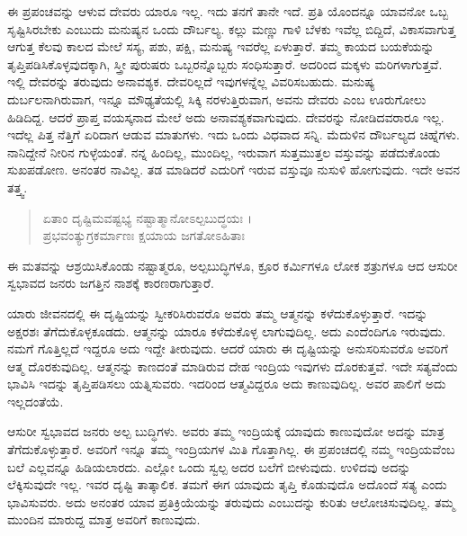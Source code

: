 ಈ ಪ್ರಪಂಚವನ್ನು ಆಳುವ ದೇವರು ಯಾರೂ ಇಲ್ಲ. ಇದು ತನಗೆ ತಾನೇ ಇದೆ. ಪ್ರತಿ ಯೊಂದನ್ನೂ ಯಾವನೋ ಒಬ್ಬ ಸೃಷ್ಟಿಸಿರಬೇಕು ಎಂಬುದು ಮನುಷ್ಯನ ಒಂದು ದೌರ್ಬಲ್ಯ. ಕಲ್ಲು ಮಣ್ಣು ಗಾಳಿ ಬೆಳಕು ಇವೆಲ್ಲ ಬಿದ್ದಿದೆ, ವಿಕಾಸವಾಗುತ್ತ ಆಗುತ್ತ ಕೆಲವು ಕಾಲದ ಮೇಲೆ ಸಸ್ಯ, ಪಶು, ಪಕ್ಷಿ, ಮನುಷ್ಯ ಇವರೆಲ್ಲ ಏಳುತ್ತಾರೆ. ತಮ್ಮ ಕಾಯದ ಬಯಕೆಯನ್ನು ತೃಪ್ತಿಪಡಿಸಿಕೊಳ್ಳವುದಕ್ಕಾಗಿ, ಸ್ತ್ರೀ ಪುರುಷರು ಒಬ್ಬರನ್ನೊಬ್ಬರು ಸಂಧಿಸುತ್ತಾರೆ. ಅದರಿಂದ ಮಕ್ಕಳು ಮರಿಗಳಾಗುತ್ತವೆ. ಇಲ್ಲಿ ದೇವರನ್ನು ತರುವುದು ಅನಾವಶ್ಯಕ. ದೇವರಿಲ್ಲದೆ ಇವುಗಳನ್ನೆಲ್ಲ ವಿವರಿಸಬಹುದು. ಮನುಷ್ಯ ದುರ್ಬಲನಾಗಿರುವಾಗ, ಇನ್ನೂ ಮೌಢ್ಯತೆಯಲ್ಲಿ ಸಿಕ್ಕಿ ನರಳುತ್ತಿರುವಾಗ, ಅವನು ದೇವರು ಎಂಬ ಊರುಗೋಲು ಹಿಡಿದಿದ್ದ. ಆದರೆ ಪ್ರಾಪ್ತ ವಯಸ್ಕನಾದ ಮೇಲೆ ಅದು ಅನಾವಶ್ಯಕವಾಗುವುದು. ದೇವರನ್ನು ನೋಡಿದವರಾರೂ ಇಲ್ಲ. ಇದೆಲ್ಲ ಪಿತ್ತ ನೆತ್ತಿಗೆ ಏರಿದಾಗ ಆಡುವ ಮಾತುಗಳು. ಇದು ಒಂದು ವಿಧವಾದ ಸನ್ನಿ. ಮೆದುಳಿನ ದೌರ್ಬಲ್ಯದ ಚಿಹ್ನೆಗಳು. ನಾನಿದ್ದೇನೆ ನೀರಿನ ಗುಳ್ಳೆಯಂತೆ. ನನ್ನ ಹಿಂದಿಲ್ಲ, ಮುಂದಿಲ್ಲ, ಇರುವಾಗ ಸುತ್ತಮುತ್ತಲ ವಸ್ತುವನ್ನು ಪಡೆದುಕೊಂಡು ಸುಖಪಡೋಣ. ಅನಂತರ ನಾವಿಲ್ಲ. ತಡ ಮಾಡಿದರೆ ಎದುರಿಗೆ ಇರುವ ವಸ್ತುವೂ ನುಸುಳಿ ಹೋಗುವುದು. ಇದೇ ಅವನ ತತ್ತ್ವ.

\begin{verse}
ಏತಾಂ ದೃಷ್ಟಿಮವಷ್ಟಭ್ಯ ನಷ್ಟಾತ್ಮಾನೋಽಲ್ಪಬುದ್ಧಯಃ ।\\ಪ್ರಭವಂತ್ಯುಗ್ರಕರ್ಮಾಣಃ ಕ್ಷಯಾಯ ಜಗತೋಽಹಿತಾಃ 
\end{verse}

{\small ಈ ಮತವನ್ನು ಆಶ್ರಯಿಸಿಕೊಂಡು ನಷ್ಟಾತ್ಮರೂ, ಅಲ್ಪಬುದ್ಧಿಗಳೂ, ಕ್ರೂರ ಕರ್ಮಿಗಳೂ ಲೋಕ ಶತ್ರುಗಳೂ ಆದ ಆಸುರೀ ಸ್ವಭಾವದ ಜನರು ಜಗತ್ತಿನ ನಾಶಕ್ಕೆ ಕಾರಣರಾಗುತ್ತಾರೆ.}

ಯಾರು ಜೀವನದಲ್ಲಿ ಈ ದೃಷ್ಟಿಯನ್ನು ಸ್ವೀಕರಿಸಿರುವರೊ ಅವರು ತಮ್ಮ ಆತ್ಮನನ್ನು ಕಳೆದುಕೊಳ್ಳುತ್ತಾರೆ. ಇದನ್ನು ಅಕ್ಷರಶಃ ತೆಗೆದುಕೊಳ್ಳಕೂಡದು. ಆತ್ಮನನ್ನು ಯಾರೂ ಕಳೆದುಕೊಳ್ಳ ಲಾಗುವುದಿಲ್ಲ. ಅದು ಎಂದೆಂದಿಗೂ ಇರುವುದು. ನಮಗೆ ಗೊತ್ತಿಲ್ಲದೆ ಇದ್ದರೂ ಅದು ಇದ್ದೇ ತೀರುವುದು. ಆದರೆ ಯಾರು ಈ ದೃಷ್ಟಿಯನ್ನು ಅನುಸರಿಸುವರೊ ಅವರಿಗೆ ಆತ್ಮ ದೊರಕುವುದಿಲ್ಲ. ಆತ್ಮನನ್ನು ಕಾಣದಂತೆ ಮಾಡಿರುವ ದೇಹ ಇಂದ್ರಿಯ ಇವುಗಳು ದೊರಕುತ್ತವೆ. ಇದೇ ಸತ್ಯವೆಂದು ಭಾವಿಸಿ ಇದನ್ನು ತೃಪ್ತಿಪಡಿಸಲು ಯತ್ನಿಸುವರು. ಇದರಿಂದ ಆತ್ಮವಿದ್ದರೂ ಅದು ಕಾಣುವುದಿಲ್ಲ. ಅವರ ಪಾಲಿಗೆ ಅದು ಇಲ್ಲದಂತೆಯೆ.

ಆಸುರೀ ಸ್ವಭಾವದ ಜನರು ಅಲ್ಪ ಬುದ್ಧಿಗಳು. ಅವರು ತಮ್ಮ ಇಂದ್ರಿಯಕ್ಕೆ ಯಾವುದು ಕಾಣುವುದೋ ಅದನ್ನು ಮಾತ್ರ ತೆಗೆದುಕೊಳ್ಳುತ್ತಾರೆ. ಅವರಿಗೆ ಇನ್ನೂ ತಮ್ಮ ಇಂದ್ರಿಯಗಳ ಮಿತಿ ಗೊತ್ತಾಗಿಲ್ಲ. ಈ ಪ್ರಪಂಚದಲ್ಲಿ ನಮ್ಮ ಇಂದ್ರಿಯವೆಂಬ ಬಲೆ ಎಲ್ಲವನ್ನೂ ಹಿಡಿಯಲಾರದು. ಎಲ್ಲೋ ಒಂದು ಸ್ವಲ್ಪ ಅದರ ಬಲೆಗೆ ಬೀಳುವುದು. ಉಳಿದವು ಅದನ್ನು ಲೆಕ್ಕಿಸುವುದೇ ಇಲ್ಲ. ಇವರ ದೃಷ್ಟಿ ತಾತ್ಕಾಲಿಕ. ತಮಗೆ ಈಗ ಯಾವುದು ತೃಪ್ತಿ ಕೊಡುವುದೊ ಅದೊಂದೆ ಸತ್ಯ ಎಂದು ಭಾವಿಸುವರು. ಅದು ಅನಂತರ ಯಾವ ಪ್ರತಿಕ್ರಿಯೆಯನ್ನು ತರುವುದು ಎಂಬುದನ್ನು ಕುರಿತು ಆಲೋಚಿಸುವುದಿಲ್ಲ. ತಮ್ಮ ಮುಂದಿನ ಮಾರುದ್ದ ಮಾತ್ರ ಅವರಿಗೆ ಕಾಣುವುದು.

